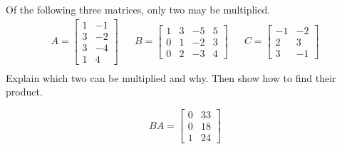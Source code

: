 
\begin{exerciseStatement}


Of the following three matrices, only two may be multiplied. 
\begin{align*} A= \left[\begin{array}{cc}
1 & -1 \\
3 & -2 \\
3 & -4 \\
1 & 4
\end{array}\right]  & & B= \left[\begin{array}{cccc}
1 & 3 & -5 & 5 \\
0 & 1 & -2 & 3 \\
0 & 2 & -3 & 4
\end{array}\right]  & & C= \left[\begin{array}{cc}
-1 & -2 \\
2 & 3 \\
3 & -1
\end{array}\right]  \\ \end{align*}
             Explain which two can be multiplied and why. Then show how to find their product.


\end{exerciseStatement}
    
\begin{exerciseAnswer} 
\[BA= \left[\begin{array}{cc}
0 & 33 \\
0 & 18 \\
1 & 24
\end{array}\right] \]
\end{exerciseAnswer}
    
